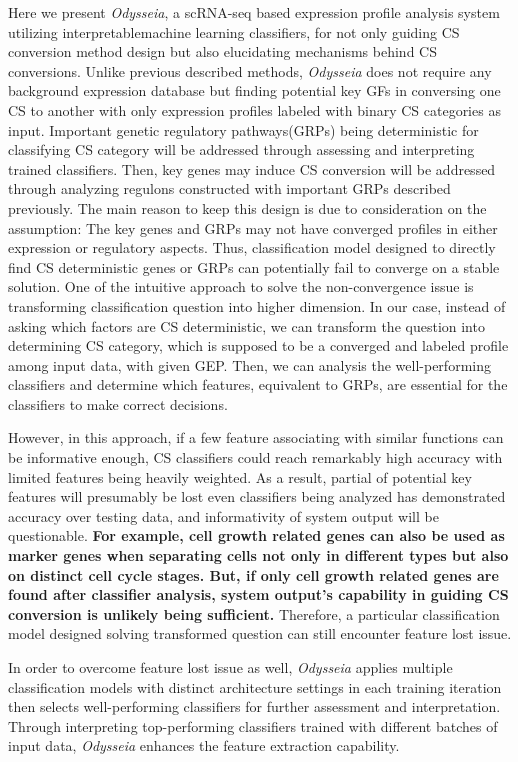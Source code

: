 \documentclass[fleqn,10pt]{wlscirep}
\begin{document}
Here we present \emph{Odysseia}, a scRNA-seq based expression profile analysis system utilizing interpretablemachine learning classifiers, for not only guiding CS conversion method design but also elucidating mechanisms behind CS conversions.
Unlike previous described methods, \emph{Odysseia} does not require any background expression database but finding potential key GFs in conversing one CS to another with only expression profiles labeled with binary CS categories as input.
Important genetic regulatory pathways(GRPs) being deterministic for classifying CS category will be addressed through assessing and interpreting trained classifiers.
Then, key genes may induce CS conversion will be addressed through analyzing regulons constructed with important GRPs described previously.
The main reason to keep this design is due to consideration on the assumption: The key genes and GRPs may not have converged profiles in either expression or regulatory aspects.
Thus, classification model designed to directly find CS deterministic genes or GRPs can potentially fail to converge on a stable solution.
One of the intuitive approach to solve the non-convergence issue is transforming classification question into higher dimension.
In our case, instead of asking which factors are CS deterministic, we can transform the question into determining CS category, which is supposed to be a converged and labeled profile among input data, with given GEP.
Then, we can analysis the well-performing classifiers and determine which features, equivalent to GRPs, are essential for the classifiers to make correct decisions.

However, in this approach, if a few feature associating with similar functions can be informative enough, CS classifiers could reach remarkably high accuracy with limited features being heavily weighted.
As a result, partial of potential key features will presumably be lost even classifiers being analyzed has demonstrated accuracy over testing data, and informativity of system output will be questionable.
\textbf{
For example, cell growth related genes can also be used as marker genes when separating cells not only in different types but also on distinct cell cycle stages.
But, if only cell growth related genes are found after classifier analysis, system output's capability in guiding CS conversion is unlikely being sufficient.
}
Therefore, a particular classification model designed solving transformed question can still encounter feature lost issue.

In order to overcome feature lost issue as well, \emph{Odysseia} applies multiple classification models with distinct architecture settings in each training iteration then selects well-performing classifiers for further assessment and interpretation.
Through interpreting top-performing classifiers trained with different batches of input data, \emph{Odysseia} enhances the feature extraction capability.
\end{document}
